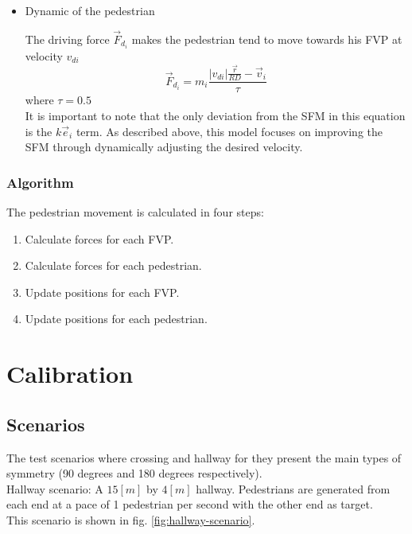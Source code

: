 \documentclass[english]{article}
\begin{document}
\begin{itemize}
    \item Dynamic of the pedestrian
        
        The driving force $\vec{F}_{d_{i}}$ makes the pedestrian tend to move towards his FVP at velocity $v_{di}$
        \[
            \vec{F}_{d_{i}} = m_{i}\frac{|v_{di}|\frac{\vec{r}}{RD} - \vec{v}_{i}}{\tau}
        \]
        where $\tau=0.5$\\
    
        It is important to note that the only deviation from the
        SFM in this equation is the $k\vec{e}_{i}$ term. As described above,
        this model focuses on improving the SFM through dynamically adjusting
        the desired velocity.   
    
    \end{itemize}
    
    \subsubsection{Algorithm}
    
    The pedestrian movement is calculated in four steps: 
    \begin{enumerate}
        \item Calculate forces for each FVP. 
        \item Calculate forces for each pedestrian. 
        \item Update positions for each FVP. 
        \item Update positions for each pedestrian. 
    \end{enumerate}

\section{Calibration}

    \subsection{Scenarios}
        
        The test scenarios where crossing and hallway for they present the
        main types of symmetry (90 degrees and 180 degrees respectively). \\
        
        Hallway scenario: A $15[m]$ by $4[m]$ hallway. Pedestrians are generated
        from each end at a pace of 1 pedestrian per second with the other
        end as target. \\
         This scenario is shown in fig. \ref{fig:hallway-scenario}.
        
\end{document}
